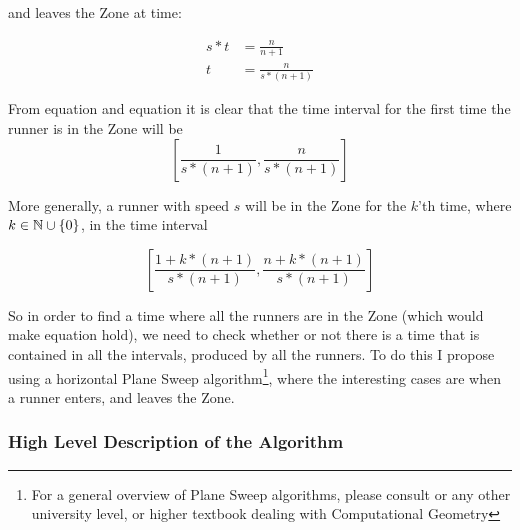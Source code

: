 and leaves the Zone at time:

\begin{equation}
\label{eqa:speedTwo}
\begin{split}
s * t &= \frac{n}{n+1} \\
t &= \frac{n}{s * (n+1)}
\end{split}
\end{equation}

From equation  and equation  it is clear that the time interval for the first time the runner is in the Zone will be 
\begin{displaymath}
\left[\frac{1}{s * (n+1)}, \frac{n}{s * (n+1)}\right]
\end{displaymath}

More generally, a runner with speed $s$ will be in the Zone for the $k$'th time, where $k \in \mathbb{N} \cup \{0\}$, in the time interval 

\begin{equation}
\label{eqa:genericZone}
\left[\frac{1 + k * (n+1)}{s * (n+1)}, \frac{n + k * (n+1)}{s * (n+1)}\right] 
\end{equation}

So in order to find a time where all the runners are in the Zone (which would make equation  hold), we need to check whether or not there is a time that is contained in all the intervals, produced by all the runners. To do this I propose using a horizontal Plane Sweep algorithm\footnote{For a general overview of Plane Sweep algorithms, please consult \cite{citeulike:3347056} or any other university level, or higher textbook dealing with Computational Geometry}, where the interesting cases are when a runner enters, and leaves the Zone. 

\subsubsection{High Level Description of the Algorithm}

